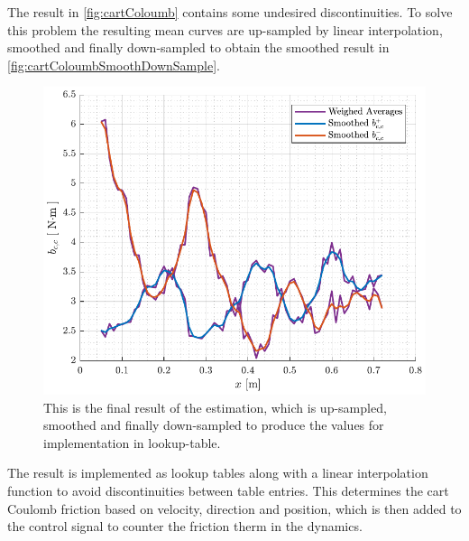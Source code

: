 The result in \autoref{fig:cartColoumb} contains some undesired discontinuities. To solve this problem the resulting mean curves are up-sampled by linear interpolation, smoothed and finally down-sampled to obtain the smoothed result in \autoref{fig:cartColoumbSmoothDownSample}.
\begin{figure}[H]
  \includegraphics[width=.42\textwidth]{figures/cartColoumbSmoothDownSample}
  \caption{This is the final result of the estimation, which is up-sampled, smoothed and finally down-sampled to produce the values for implementation in lookup-table.}
  \label{fig:cartColoumbSmoothDownSample}
\end{figure}
The result is implemented as lookup tables along with a linear interpolation function to avoid discontinuities between table entries. This determines the cart Coulomb friction based on velocity, direction and position, which is then added to the control signal to counter the friction therm in the dynamics.

